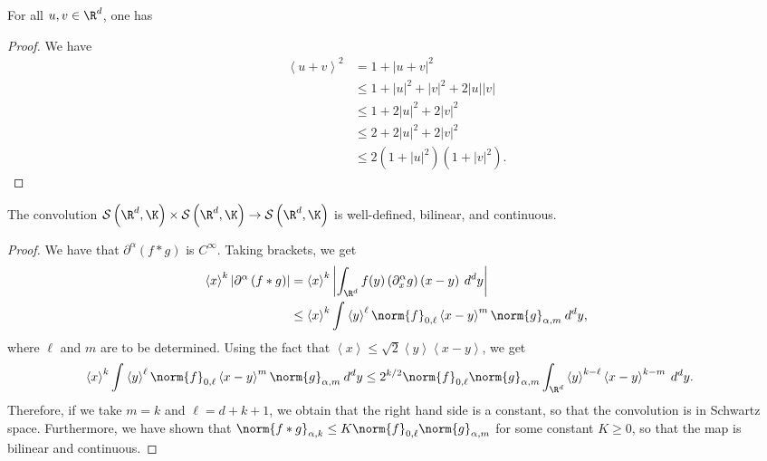 \documentclass[10pt]{mypackage}
\begin{document}
\begin{lemma}
  For all $u,v\in \R^d$, one has
\end{lemma}
\begin{proof}
  We have
  \begin{align*}
    \left\langle u + v \right\rangle^2 &= 1 + \left\vert u + v \right\vert^2\\
                                       &\leq 1 + \left\vert u \right\vert^2 + \left\vert v \right\vert^2 + 2\left\vert u \right\vert\left\vert v \right\vert\\
                                       &\leq 1 + 2\left\vert u \right\vert^2 + 2\left\vert v \right\vert^2\\
                                       &\leq 2 + 2\left\vert u \right\vert^2 + 2\left\vert v \right\vert^2\\
                                       &\leq 2 \left( 1 + \left\vert u \right\vert^2 \right) \left( 1 + \left\vert v \right\vert^2 \right).
  \end{align*}
\end{proof}
\begin{theorem}
  The convolution $\mathcal{S}\left( \R^d,\K \right)\times \mathcal{S}\left( \R^d,\K \right)\rightarrow \mathcal{S}\left( \R^d,\K \right)$ is well-defined, bilinear, and continuous.
\end{theorem}
\begin{proof}
  We have that $\partial^{\alpha}\left( f\ast g \right)$ is $C^{\infty}$. Taking brackets, we get
  \begin{align*}
    \left\langle x \right\rangle^{k} \left\vert \partial^{\alpha}\left( f\ast g \right) \right\vert &= \left\langle x \right\rangle^k \left\vert \int_{\R^d}^{} f(y)\left( \partial^{\alpha}_xg \right)\left( x-y \right)\:d^{d}y \right\vert\\
                                               &\leq \left\langle x \right\rangle^k \int_{}^{} \left\langle y \right\rangle^{\ell}\norm{f}_{0,\ell}\left\langle x-y \right\rangle^{m}\norm{g}_{\alpha,m}\:d^{d}y,
  \end{align*}
  where $\ell$ and $m$ are to be determined. Using the fact that $\left\langle x \right\rangle\leq \sqrt{2}\left\langle y \right\rangle\left\langle x-y \right\rangle$, we get
  \begin{align*}
    \left\langle x \right\rangle^k \int_{}^{} \left\langle y \right\rangle^{\ell}\norm{f}_{0,\ell}\left\langle x-y \right\rangle^{m}\norm{g}_{\alpha,m}\:d^{d}y &\leq 2^{k/2}\norm{f}_{0,\ell}\norm{g}_{\alpha,m} \int_{\R^d}^{} \left\langle y \right\rangle^{k-\ell} \left\langle x-y \right\rangle^{k-m}\:d^{d}y.
  \end{align*}
  Therefore, if we take $m = k$ and $\ell = d + k +1$, we obtain that the right hand side is a constant, so that the convolution is in Schwartz space. Furthermore, we have shown that $\norm{f\ast g}_{\alpha,k} \leq K \norm{f}_{0,\ell}\norm{g}_{\alpha,m}$ for some constant $K \geq 0$, so that the map is bilinear and continuous.
\end{proof}
\end{document}
